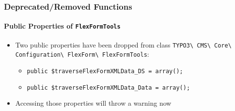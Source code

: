 \begin{frame}[fragile]
	\frametitle{Deprecated/Removed Functions}
	\framesubtitle{Public Properties of \texttt{FlexFormTools}}

	\begin{itemize}
		\item Two public properties have been dropped from class
			\texttt{TYPO3\textbackslash
				CMS\textbackslash
				Core\textbackslash
				Configuration\textbackslash
				FlexForm\textbackslash
				FlexFormTools}:

		\begin{itemize}
			\item \texttt{public \$traverseFlexFormXMLData\_DS = array();}
			\item \texttt{public \$traverseFlexFormXMLData\_Data = array();}
		\end{itemize}

		\item Accessing those properties will throw a warning now

	\end{itemize}

\end{frame}




